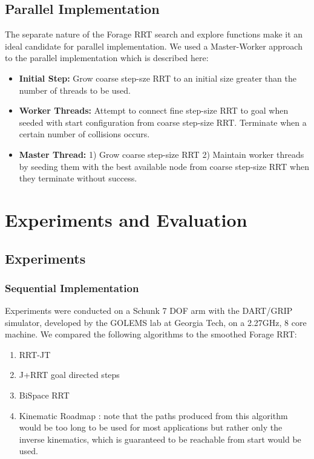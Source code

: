 \documentclass[conference]{IEEEtran}
\begin{document}
\subsection{Parallel Implementation}
The separate nature of the Forage RRT search and explore functions make it an ideal candidate for parallel implementation. We used a
Master-Worker approach to the parallel implementation which is described here:
\begin{itemize}
\item \textbf{Initial Step: } Grow coarse step-sze RRT to an initial size greater than the number of threads to be used.
\item \textbf{Worker Threads: } Attempt to connect fine step-size RRT to goal when seeded with start configuration from coarse step-size
RRT. Terminate when a certain number of collisions occurs.
\item \textbf{Master Thread: } 1) Grow coarse step-size RRT 2) Maintain worker threads by seeding them with the best available node from
coarse step-size RRT when they terminate without success.
\end{itemize}

\section{Experiments and Evaluation}
\label{sec:evaluation}
\subsection{Experiments}
\subsubsection{Sequential Implementation}
Experiments were conducted on a Schunk 7 DOF arm with the DART/GRIP simulator, developed by the GOLEMS lab at Georgia Tech, on a 2.27GHz, 8
core machine. We compared the following algorithms to the smoothed Forage RRT:
\begin{enumerate}
	\item RRT-JT \cite{vande07}
	\item J+RRT \cite{vahrenkamp09}
	      goal directed steps
	\item BiSpace RRT \cite{diankov08}
	\item Kinematic Roadmap \cite{ahuactzin99}: note that the paths produced from this algorithm would be too long to be used for most
	      applications but rather only the inverse kinematics, which is guaranteed to be reachable from start would be used.
\end{enumerate}
\end{document}
